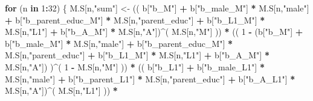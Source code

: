 \documentclass[
]{book}
\newenvironment{Shaded}{\begin{snugshade}}{\end{snugshade}}
\newcommand{\ControlFlowTok}[1]{\textcolor[rgb]{0.13,0.29,0.53}{\textbf{#1}}}
\newcommand{\DecValTok}[1]{\textcolor[rgb]{0.00,0.00,0.81}{#1}}
\newcommand{\NormalTok}[1]{#1}
\newcommand{\OtherTok}[1]{\textcolor[rgb]{0.56,0.35,0.01}{#1}}
\newcommand{\SpecialCharTok}[1]{\textcolor[rgb]{0.81,0.36,0.00}{\textbf{#1}}}
\newcommand{\StringTok}[1]{\textcolor[rgb]{0.31,0.60,0.02}{#1}}
\begin{document}
\begin{Shaded}
\begin{Highlighting}[]
  \ControlFlowTok{for}\NormalTok{ (n }\ControlFlowTok{in} \DecValTok{1}\SpecialCharTok{:}\DecValTok{32}\NormalTok{) \{}
\NormalTok{    M.S[n,}\StringTok{"sum"}\NormalTok{] }\OtherTok{\textless{}{-}}\NormalTok{ (( b[}\StringTok{"b\_M"}\NormalTok{] }\SpecialCharTok{+}                                                              
\NormalTok{                         b[}\StringTok{"b\_male\_M"}\NormalTok{] }\SpecialCharTok{*}\NormalTok{ M.S[n,}\StringTok{"male"}\NormalTok{] }\SpecialCharTok{+} 
\NormalTok{                         b[}\StringTok{"b\_parent\_educ\_M"}\NormalTok{] }\SpecialCharTok{*}\NormalTok{ M.S[n,}\StringTok{"parent\_educ"}\NormalTok{] }\SpecialCharTok{+} 
\NormalTok{                         b[}\StringTok{"b\_L1\_M"}\NormalTok{] }\SpecialCharTok{*}\NormalTok{ M.S[n,}\StringTok{"L1"}\NormalTok{] }\SpecialCharTok{+}
\NormalTok{                         b[}\StringTok{"b\_A\_M"}\NormalTok{] }\SpecialCharTok{*}\NormalTok{ M.S[n,}\StringTok{"A"}\NormalTok{])}\SpecialCharTok{\^{}}\NormalTok{( M.S[n,}\StringTok{"M"}\NormalTok{] )) }\SpecialCharTok{*}
\NormalTok{      (( }\DecValTok{1} \SpecialCharTok{{-}}\NormalTok{ (b[}\StringTok{"b\_M"}\NormalTok{] }\SpecialCharTok{+} 
\NormalTok{                b[}\StringTok{"b\_male\_M"}\NormalTok{] }\SpecialCharTok{*}\NormalTok{ M.S[n,}\StringTok{"male"}\NormalTok{] }\SpecialCharTok{+} 
\NormalTok{                b[}\StringTok{"b\_parent\_educ\_M"}\NormalTok{] }\SpecialCharTok{*}\NormalTok{ M.S[n,}\StringTok{"parent\_educ"}\NormalTok{] }\SpecialCharTok{+} 
\NormalTok{                b[}\StringTok{"b\_L1\_M"}\NormalTok{] }\SpecialCharTok{*}\NormalTok{ M.S[n,}\StringTok{"L1"}\NormalTok{] }\SpecialCharTok{+}
\NormalTok{                b[}\StringTok{"b\_A\_M"}\NormalTok{] }\SpecialCharTok{*}\NormalTok{ M.S[n,}\StringTok{"A"}\NormalTok{]) )}\SpecialCharTok{\^{}}\NormalTok{( }\DecValTok{1} \SpecialCharTok{{-}}\NormalTok{ M.S[n,}\StringTok{"M"}\NormalTok{] )) }\SpecialCharTok{*}
\NormalTok{      (( b[}\StringTok{"b\_L1"}\NormalTok{] }\SpecialCharTok{+}                                                           
\NormalTok{           b[}\StringTok{"b\_male\_L1"}\NormalTok{] }\SpecialCharTok{*}\NormalTok{ M.S[n,}\StringTok{"male"}\NormalTok{] }\SpecialCharTok{+}  
\NormalTok{           b[}\StringTok{"b\_parent\_L1"}\NormalTok{] }\SpecialCharTok{*}\NormalTok{ M.S[n,}\StringTok{"parent\_educ"}\NormalTok{] }\SpecialCharTok{+}
\NormalTok{           b[}\StringTok{"b\_A\_L1"}\NormalTok{] }\SpecialCharTok{*}\NormalTok{ M.S[n,}\StringTok{"A"}\NormalTok{])}\SpecialCharTok{\^{}}\NormalTok{( M.S[n,}\StringTok{"L1"}\NormalTok{] )) }\SpecialCharTok{*}

\end{Highlighting}
\end{Shaded}
\end{document}
